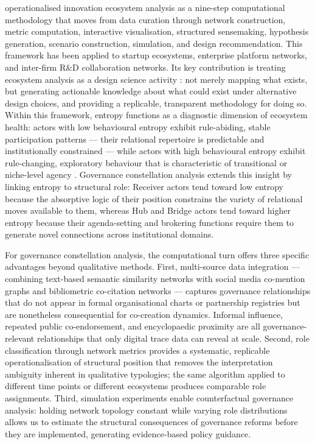 \documentclass[review,12pt]{elsarticle}
\begin{document}
\citet{basole2023computational} operationalised innovation ecosystem analysis as a nine-step computational methodology that moves from data curation through network construction, metric computation, interactive visualisation, structured sensemaking, hypothesis generation, scenario construction, simulation, and design recommendation. This framework has been applied to startup ecosystems, enterprise platform networks, and inter-firm R\&D collaboration networks. Its key contribution is treating ecosystem analysis as a design science activity \citep{hevner2004design}: not merely mapping what exists, but generating actionable knowledge about what could exist under alternative design choices, and providing a replicable, transparent methodology for doing so. Within this framework, entropy functions as a diagnostic dimension of ecosystem health: actors with low behavioural entropy exhibit rule-abiding, stable participation patterns --- their relational repertoire is predictable and institutionally constrained --- while actors with high behavioural entropy exhibit rule-changing, exploratory behaviour that is characteristic of transitional or niche-level agency \citep{basole2023computational}. Governance constellation analysis extends this insight by linking entropy to structural role: Receiver actors tend toward low entropy because the absorptive logic of their position constrains the variety of relational moves available to them, whereas Hub and Bridge actors tend toward higher entropy because their agenda-setting and brokering functions require them to generate novel connections across institutional domains.

For governance constellation analysis, the computational turn offers three specific advantages beyond qualitative methods. First, multi-source data integration --- combining text-based semantic similarity networks with social media co-mention graphs and bibliometric co-citation networks --- captures governance relationships that do not appear in formal organisational charts or partnership registries but are nonetheless consequential for co-creation dynamics. Informal influence, repeated public co-endorsement, and encyclopaedic proximity are all governance-relevant relationships that only digital trace data can reveal at scale. Second, role classification through network metrics provides a systematic, replicable operationalisation of structural position that removes the interpretation ambiguity inherent in qualitative typologies; the same algorithm applied to different time points or different ecosystems produces comparable role assignments. Third, simulation experiments enable counterfactual governance analysis: holding network topology constant while varying role distributions allows us to estimate the structural consequences of governance reforms before they are implemented, generating evidence-based policy guidance.
\end{document}
